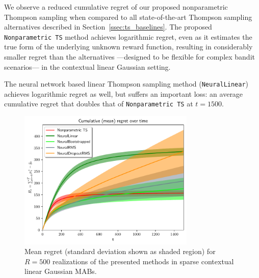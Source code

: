 We observe a reduced cumulative regret of our proposed nonparametric Thompson sampling when compared to all state-of-the-art Thompson sampling alternatives described in Section~\ref{ssec:ts_baselines}.
The proposed \texttt{Nonparametric TS} method achieves logarithmic regret, even as it estimates the true form of the underlying unknown reward function, resulting in considerably smaller regret than the alternatives ---designed to be flexible for complex bandit scenarios--- in the contextual linear Gaussian setting.

The neural network based linear Thompson sampling method (\ie \texttt{NeuralLinear}) achieves logarithmic regret as well, but suffers an important loss: an average cumulative regret that doubles that of \texttt{Nonparametric TS} at $t=1500$.

\begin{figure}[!ht]
	\vspace*{-2ex}
	\centering
	\includegraphics[width=0.75\textwidth]{./figs/sparse_linear_showdown_baselines/cum_optexpected_regret_top_five_std}
	\vspace*{-5ex}
	\caption{Mean regret (standard deviation shown as shaded region) for $R=500$ realizations of the presented methods in sparse contextual linear Gaussian MABs.}
	\label{fig:sparse_linear_showdown_baselines_top_regret}
	\vspace*{-2ex}
\end{figure}
